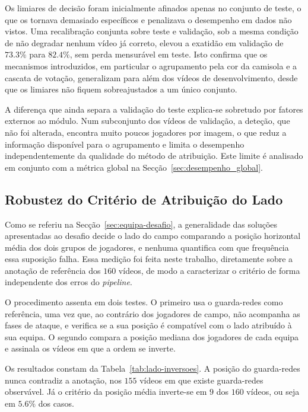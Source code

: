 Os limiares de decisão foram inicialmente afinados apenas no conjunto de teste, o que os
tornava demasiado específicos e penalizava o desempenho em dados não vistos. Uma
recalibração conjunta sobre teste e validação, sob a mesma condição de não degradar nenhum
vídeo já correto, elevou a exatidão em validação de $73.3\%$ para $82.4\%$, sem perda
mensurável em teste. Isto confirma que os mecanismos introduzidos, em particular o
agrupamento pela cor da camisola e a cascata de votação, generalizam para além dos vídeos
de desenvolvimento, desde que os limiares não fiquem sobreajustados a um único conjunto.

A diferença que ainda separa a validação do teste explica-se sobretudo por fatores externos
ao módulo. Num subconjunto dos vídeos de validação, a deteção, que não foi alterada,
encontra muito poucos jogadores por imagem, o que reduz a informação disponível para o
agrupamento e limita o desempenho independentemente da qualidade do método de atribuição.
Este limite é analisado em conjunto com a métrica global na Secção~\ref{sec:desempenho_global}.

\subsection{Robustez do Critério de Atribuição do Lado}
\label{sec:res_lado_quantificacao}

Como se referiu na Secção~\ref{sec:equipa-desafio}, a generalidade das soluções apresentadas
ao desafio decide o lado do campo comparando a posição horizontal média dos dois grupos de
jogadores, e nenhuma quantifica com que frequência essa suposição falha. Essa medição foi
feita neste trabalho, diretamente sobre a anotação de referência dos $160$ vídeos, de modo
a caracterizar o critério de forma independente dos erros do \emph{pipeline}.

O procedimento assenta em dois testes. O primeiro usa o guarda-redes como referência, uma
vez que, ao contrário dos jogadores de campo, não acompanha as fases de ataque, e verifica
se a sua posição é compatível com o lado atribuído à sua equipa. O segundo compara a posição
mediana dos jogadores de cada equipa e assinala os vídeos em que a ordem se inverte.

Os resultados constam da Tabela~\ref{tab:lado-inversoes}. A posição do guarda-redes nunca
contradiz a anotação, nos $155$ vídeos em que existe guarda-redes observável. Já o critério
da posição média inverte-se em $9$ dos $160$ vídeos, ou seja em $5.6\%$ dos casos.

